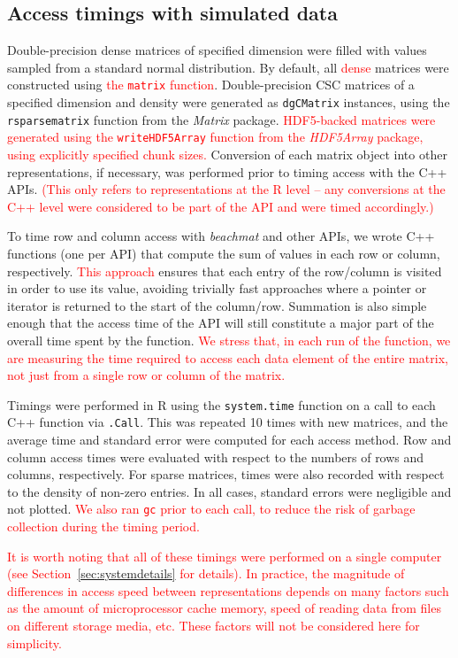 \documentclass{article}
\newcommand{\beachmat}{\textit{beachmat}}
\newcommand{\code}[1]{\texttt{#1}}
\newcommand{\revised}[1]{\textcolor{red}{#1}}
\begin{document}
\subsection{Access timings with simulated data}
Double-precision dense matrices of specified dimension were filled with values sampled from a standard normal distribution.
By default, all \revised{dense} matrices were constructed using \revised{the \code{matrix} function}.
Double-precision CSC matrices of a specified dimension and density were generated as \code{dgCMatrix} instances, using the \code{rsparsematrix} function from the \textit{Matrix} package.
\revised{HDF5-backed matrices were generated using the \code{writeHDF5Array} function from the \textit{HDF5Array} package, using explicitly specified chunk sizes.}
Conversion of each matrix object into other representations, if necessary, was performed prior to timing access with the C++ APIs.
\revised{(This only refers to representations at the R level -- any conversions at the C++ level were considered to be part of the API and were timed accordingly.)}

To time row and column access with \beachmat{} and other APIs, we wrote C++ functions (one per API) that compute the sum of values in each row or column, respectively.
\revised{This approach} ensures that each entry of the row/column is visited in order to use its value, avoiding trivially fast approaches where a pointer or iterator is returned to the start of the column/row.
Summation is also simple enough that the access time of the API will still constitute a major part of the overall time spent by the function.
\revised{We stress that, in each run of the function, we are measuring the time required to access each data element of the entire matrix, not just from a single row or column of the matrix.}

Timings were performed in R using the \code{system.time} function on a call to each C++ function via \code{.Call}. 
This was repeated 10 times with new matrices, and the average time and standard error were computed for each access method. 
Row and column access times were evaluated with respect to the numbers of rows and columns, respectively.
For sparse matrices, times were also recorded with respect to the density of non-zero entries.
In all cases, standard errors were negligible and not plotted.
\revised{We also ran \code{gc} prior to each call, to reduce the risk of garbage collection during the timing period.}

\revised{It is worth noting that all of these timings were performed on a single computer (see Section~\ref{sec:systemdetails} for details). 
In practice, the magnitude of differences in access speed between representations depends on many factors such as the amount of microprocessor cache memory, speed of reading data from files on different storage media, etc.
These factors will not be considered here for simplicity.}
\end{document}

